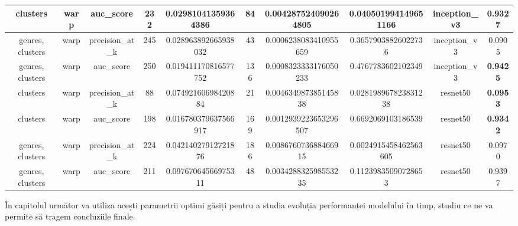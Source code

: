 \begin{table}
{\begin{tabular}{|c|c|c|c|c|c|c|c|c|c|}
\hline
clusters                            & warp                            & auc\_score                          & 232             & 0.02981041359364386    & 84                     & 0.004287524090264805  & 0.040501994149651166  & inception\_v3                    & 0.9327                              \\ 
\hline
genres, clusters                    & warp                            & precision\_at\_k                    & 245             & 0.028963892665938032   & 43                     & 0.0006238083410955659 & 0.36579038826022736   & inception\_v3                    & 0.0905                              \\ 
\hline
genres, clusters                    & warp                            & auc\_score                          & 250             & 0.019411170816577752   & 136                    & 0.0008323333176050233 & 0.4767783602102349    & inception\_v3                    & \textbf{0.9425}                              \\ 
\hline
clusters                            & warp                            & precision\_at\_k                    & 88              & 0.07492160698420884    & 21                     & 0.004634987385145838  & 0.028198967823831238  & resnet50                         & \textbf{0.0953}                              \\ 
\hline
clusters                            & warp                            & auc\_score                          & 198             & 0.016780379637566917   & 169                    & 0.0012939223653296507 & 0.6692069103186539    & resnet50                         & \textbf{0.9342}                              \\ 
\hline
genres, clusters                    & warp                            & precision\_at\_k                    & 224             & 0.04214027912721876    & 186                    & 0.008676073688466915  & 0.0024915458462563605 & resnet50                         & 0.0970                              \\ 
\hline
genres, clusters                    & warp                            & auc\_score                          & 211             & 0.09767064566975311    & 48                     & 0.003428832598553235  & 0.11239835090728653   & resnet50                         & 0.9397                              \\
\hline
\end{tabular}}
\end{table}

În capitolul următor va utiliza acești parametrii optimi găsiți pentru a studia evoluția performanței modelului în timp, studiu ce ne va permite să tragem concluziile finale.